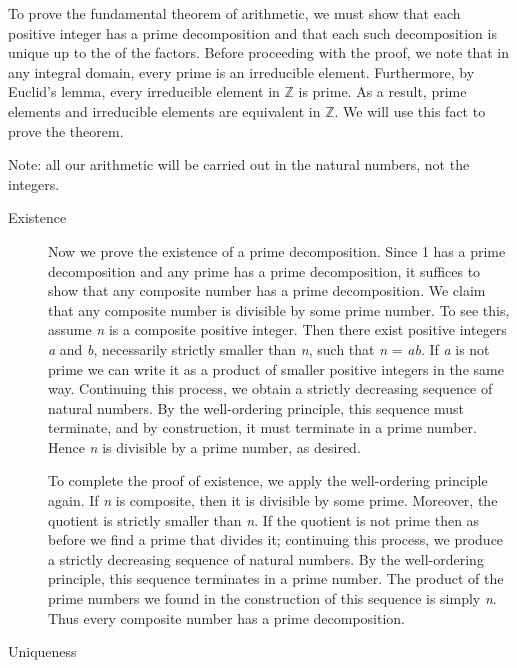 \documentclass{article}
\newcommand{\fm}[1]{{\it #1}}
\begin{document}
To prove the fundamental theorem of arithmetic, we must show that each
positive integer has a prime decomposition and that each such
decomposition is unique up to the  of the factors.  Before
proceeding with the proof, we note that in any integral domain, every
prime is an irreducible element.  Furthermore, by Euclid's lemma, every irreducible element in $\mathbb{Z}$ is prime.  As a result, prime elements and irreducible elements are equivalent in $\mathbb{Z}$.  We will use this fact to prove the theorem.

Note: all our arithmetic will be carried out in the natural numbers, not the integers.

\begin{description}
\item[Existence]

Now we prove the existence of a prime decomposition.  Since 1 has a
prime decomposition and any prime has a prime decomposition, it
suffices to show that any composite number has a prime decomposition.
We claim that any composite number is divisible by some prime number.
To see this, assume \fm{n} is a composite positive integer.  Then
there exist positive integers \fm{a} and \fm{b}, necessarily strictly
smaller than \fm{n}, such that \fm{n} = \fm{ab}.  If \fm{a} is not
prime we can write it as a product of smaller positive integers in the
same way.  Continuing this process, we obtain a strictly decreasing
sequence of natural numbers.  By the well-ordering principle, this
sequence must terminate, and by construction, it must terminate in a
prime number.  Hence \fm{n} is divisible by a prime number, as
desired.

To complete the proof of existence, we apply the well-ordering
principle again.  If \fm{n} is composite, then it is divisible by some
prime.  Moreover, the quotient is strictly smaller than \fm{n}.  If
the quotient is not prime then as before we find a prime that divides
it; continuing this process, we produce a strictly decreasing sequence
of natural numbers.  By the well-ordering principle, this sequence
terminates in a prime number.  The product of the prime numbers we
found in the construction of this sequence is simply \fm{n}.  Thus
every composite number has a prime decomposition.

\item[Uniqueness]


\end{description}
\end{document}
